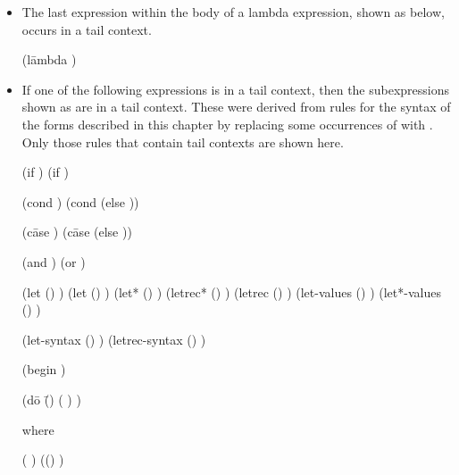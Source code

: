 \begin{itemize}
\item The last expression within the body of a lambda expression,
  shown as  below, occurs in a tail context.
\begin{grammar}%
(l\=ambda 
  \> 
  \> )
\end{grammar}%

\item If one of the following expressions is in a tail context,
then the subexpressions shown as  are in a tail context.
These were derived from rules for the syntax of the forms described in
this chapter by replacing some occurrences of 
with .  Only those rules that contain tail contexts
are shown here.

\begin{grammar}%
(if   )
(if  )

(cond )
(cond  (else ))

(c\=ase 
  \>)
(c\=ase 
  \>
  \>(else ))

(and  )
(or  )

(let () )
(let  () )
(let* () )
(letrec* () )
(letrec () )
(let-values () )
(let*-values () )

(let-syntax () )
(letrec-syntax () )

(begin )

(d\=o \=()
  \>  \>( )
  \>)

{\rm where}

 \: ( )
 \: (() )


\end{grammar}
\end{itemize}
